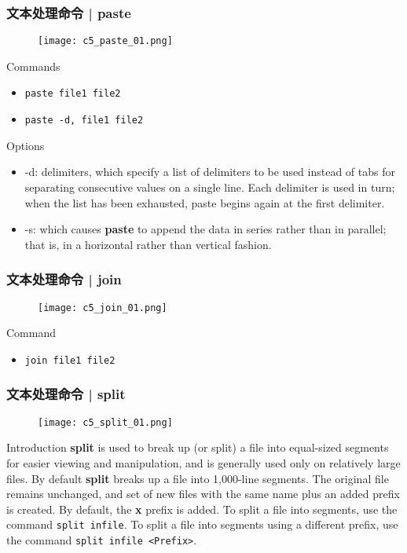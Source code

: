 \begin{frame}[fragile]
  \frametitle{文本处理命令 | paste}
  \begin{figure}
    \centering
    \texttt{[image: c5\_paste\_01.png]}
  \end{figure}
  \pause
  \begin{block}{Commands}
    \begin{itemize}
      \item \verb|paste file1 file2|
      \item \verb|paste -d, file1 file2|
    \end{itemize}
  \end{block}
  \pause
  \begin{block}{Options}
    {\scriptsize
    \begin{itemize}
      \item -d: delimiters, which specify a list of delimiters to be used instead of tabs for separating consecutive values on a single line. Each delimiter is used in turn; when the list has been exhausted, paste begins again at the first delimiter.
      \item -s: which causes \textbf{paste} to append the data in series rather than in parallel; that is, in a horizontal rather than vertical fashion.
    \end{itemize}
    }
  \end{block}
\end{frame}

\begin{frame}[fragile]
  \frametitle{文本处理命令 | join}
  \begin{figure}
    \centering
    \texttt{[image: c5\_join\_01.png]}
  \end{figure}
  \pause
  \begin{block}{Command}
    \begin{itemize}
      \item \verb|join file1 file2|
    \end{itemize}
  \end{block}
\end{frame}

\begin{frame}[fragile]
  \frametitle{文本处理命令 | split}
  \begin{figure}
    \centering
    \texttt{[image: c5\_split\_01.png]}
  \end{figure}
  \pause
  \vspace{-0.3cm}
  \begin{block}{Introduction}
    {\footnotesize\textbf{split} is used to break up (or split) a file into equal-sized segments for easier viewing and manipulation, and is generally used only on relatively large files. By default \textbf{split} breaks up a file into 1,000-line segments. The original file remains unchanged, and set of new files with the same name plus an added prefix is created. By default, the \textbf{x} prefix is added. To split a file into segments, use the command \verb|split infile|. To split a file into segments using a different prefix, use the command \verb|split infile <Prefix>|.}
  \end{block}
\end{frame}

